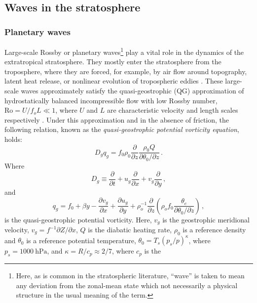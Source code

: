 \subsection{Waves in the stratosphere}
\label{sec:plan-waves-strat}

\subsubsection{Planetary waves}
\label{sec:planetary-waves}

Large-scale Rossby or planetary waves\footnote{Here, as is common in the
  stratospheric literature, ``wave'' is taken to mean any deviation from the
  zonal-mean state which not necessarily a physical structure in the usual
  meaning of the term.} play a vital
role in the dynamics of the extratropical stratosphere. They mostly enter the
stratosphere from the troposphere, where they are forced, for example, by air
flow around topography, latent heat release, or nonlinear evolution of
tropospheric eddies \citep{Scinocca1998}. These large-scale waves approximately
satisfy the quasi-geostrophic (QG) approximation of hydrostatically balanced
incompressible flow with low Rossby number, $\mathrm{Ro} = U/f_oL \ll 1$, where
$U$ and $L$ are characteristic velocity and length scales respectively
\citep{Andrews1987}. Under this approximation and in the absence of friction,
the following relation, known as the \emph{quasi-geostrophic potential vorticity
  equation}, holds:
\begin{equation}
D_gq_g = f_0\rho_0 \frac{\partial}{\partial z}
\frac{\rho_0Q}{\partial\theta_{0}/\partial z} \, . 
\label{eq:qgpv}
\end{equation}
Where
\begin{equation}
D_g \equiv \frac{\partial}{\partial t} + u_g\frac{\partial}{\partial x} +
v_g\frac{\partial}{\partial y} \, , 
\end{equation}
and 
\begin{equation}
  q_g = f_0 + \beta y - \frac{\partial v_g}{\partial x} + \frac{\partial u_g}{\partial
    y} + \rho_o^{-1}\frac{\partial}{\partial
    z}\left(\rho_of_0\frac{\theta_e}{\partial\theta_{0}/\partial z}\right) \, , 
\end{equation}
is the quasi-geostrophic potential vorticity. Here, $v_g$ is the geostrophic
meridional velocity, $v_g = f^{-1}\partial Z/\partial x$, $Q$ is the diabatic
heating rate, $\rho_0$ is a reference density and $\theta_0$ is a reference
potential temperature, $\theta_0 = T_s(p_s/p)^\kappa$, where
$p_s=1000~\mathrm{hPa}$, and $\kappa = R/c_p \approx 2/7$, where $c_p$ is the
